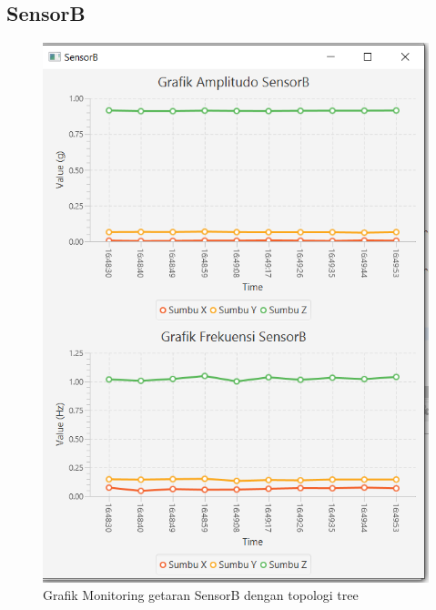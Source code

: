 \subsection{SensorB}
\begin{figure}[H] 
	\centering  
	\includegraphics[scale=1]{Lampiran/HasilPengujian/sensorB_tree.PNG} 
	\caption[Grafik Monitoring getaran SensorB dengan topologi tree]{Grafik Monitoring getaran SensorB dengan topologi tree}
	\label{fig:grafik_B_tree_paskal} 
\end{figure}

